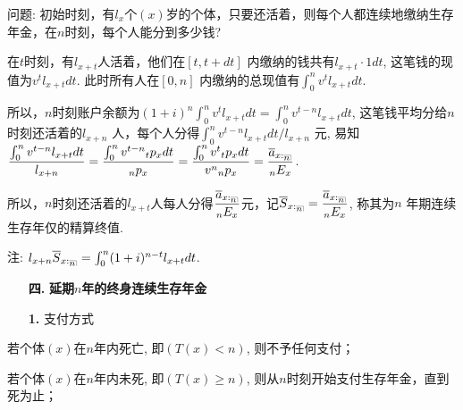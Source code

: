 \documentclass[a4paper,10pt]{ctexbook}
\makeatletter
\newcommand{\hei}{\CJKfamily{hei}}      %
\DeclareRobustCommand{\annu}[1]{_{%
    \def\arraystretch{0}%
    \setlength\arraycolsep{1pt}%
    \setlength\arrayrulewidth{.2pt}%
    \begin{array}[b]{@{}c|}\hline
        \\[\arraycolsep]%
        \scriptstyle #1%
    \end{array}%
}}
\makeatother
\begin{document}
问题: 初始时刻，有$l_x$个$(x)$岁的个体，只要还活着，则每个人都连续地缴纳生存年金，在$n$时刻，每个人能分到多少钱?

在$t$时刻，有$l_{x+t}$人活着，他们在$[t, t+dt]$ 内缴纳的钱共有$l_{x+t}\cdot 1dt$, 这笔钱的现值为$v^tl_{x+t}dt$. 此时所有人在$[0, n]$ 内缴纳的总现值有$ \int_0^{n} v^tl_{x+t}dt$.

所以，$n$时刻账户余额为$(1+i)^n\int_0^{n} v^tl_{x+t}dt=\int_0^{n} v^{t-n}l_{x+t}dt$, 这笔钱平均分给$n$ 时刻还活着的$l_{x+n}$ 人，每个人分得$\int_0^{n} v^{t-n}l_{x+t}dt/{l_{x+n}}$ 元, 易知$\dfrac{\int_0^{n} v^{t-n}l_{x+t}dt}{l_{x+n}}=\dfrac{\int_0^{n} v^{t-n}{}_tp_xdt}{{}_np_x}=\dfrac{\int_0^{n} v^{t}{}_tp_xdt}{v^n{}_np_x}=\dfrac{ \overline{a}_{x:\annu{n}}}{{}_nE_x}$.

所以，$n$时刻还活着的$l_{x+t}$人每人分得$\dfrac{ \overline{a}_{x:\annu{n}}}{{}_nE_x}$元，记$\overline{S}_{x:\annu{n}}=\dfrac{ \overline{a}_{x:\annu{n}}}{{}_nE_x}$, 称其为$n$ 年期连续生存年仅的精算终值.

注: $l_{x+n}\overline{S}_{x:\annu{n}}=\int_0^{n} (1+i)^{n-t}l_{x+t}dt$.


\begin{itemize}
    \item[{\bf\hei 四.}]{\bf\hei 延期$n$年的终身连续生存年金}
\end{itemize}

\begin{itemize}
    \item[{\bf\hei1.}] 支付方式
\end{itemize}

若个体$(x)$在$n$年内死亡, 即$(T(x)<n)$, 则不予任何支付；

若个体$(x)$在$n$年内未死, 即$(T(x)\ge n)$, 则从$n$时刻开始支付生存年金，直到死为止；
\end{document}
